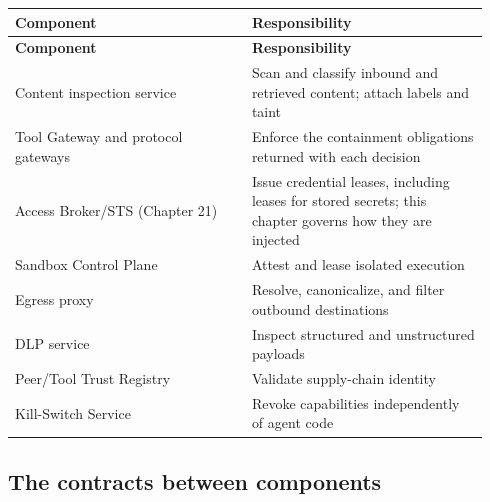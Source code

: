 \BookTableStart
\small
\begin{longtable}{@{}Y{0.4700\linewidth}Y{0.4700\linewidth}@{}}
\color{white}\bfseries \textbf{Component} & \color{white}\bfseries \textbf{Responsibility} \\
\endfirsthead
{}
\color{white}\bfseries \textbf{Component} & \color{white}\bfseries \textbf{Responsibility} \\
\endhead
Content inspection service & Scan and classify inbound and retrieved content; attach labels and taint \\
Tool Gateway and protocol gateways & Enforce the containment obligations returned with each decision \\
Access Broker/STS (Chapter 21) & Issue credential leases, including leases for stored secrets; this chapter governs how they are injected \\
Sandbox Control Plane & Attest and lease isolated execution \\
Egress proxy & Resolve, canonicalize, and filter outbound destinations \\
DLP service & Inspect structured and unstructured payloads \\
Peer/Tool Trust Registry & Validate supply-chain identity \\
Kill-Switch Service & Revoke capabilities independently of agent code \\
\end{longtable}
\BookTableEnd

\subsection{The contracts between components}

